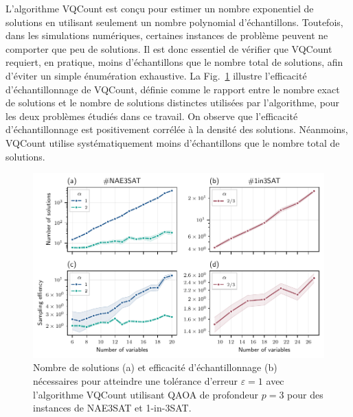 L'algorithme VQCount est conçu pour estimer un nombre exponentiel de solutions en utilisant seulement un nombre polynomial d'échantillons. Toutefois, dans les simulations numériques, certaines instances de problème peuvent ne comporter que peu de solutions. Il est donc essentiel de vérifier que VQCount requiert, en pratique, moins d'échantillons que le nombre total de solutions, afin d'éviter un simple énumération exhaustive. La Fig.~\ref{fig:sampling-efficiency} illustre l'efficacité d'échantillonnage de VQCount, définie comme le rapport entre le nombre exact de solutions et le nombre de solutions distinctes utilisées par l'algorithme, pour les deux problèmes étudiés dans ce travail. On observe que l'efficacité d'échantillonnage est positivement corrélée à la densité des solutions. Néanmoins, VQCount utilise systématiquement moins d'échantillons que le nombre total de solutions.


\begin{figure}[H]
    \centering
    \includegraphics[width=1\textwidth]{figures/sampling-efficiency.pdf}
    \caption[Efficacité de l'échantillonnage pour des problèmes \#P-difficile]{Nombre de solutions (a) et efficacité d'échantillonnage (b) nécessaires pour atteindre une tolérance d'erreur $\varepsilon = 1$ avec l'algorithme VQCount utilisant QAOA de profondeur $p=3$ pour des instances de NAE3SAT et 1-in-3SAT.}
    \label{fig:sampling-efficiency}
\end{figure}


